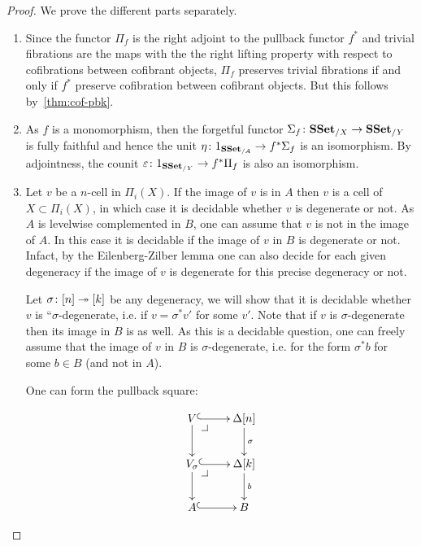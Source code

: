 \documentclass[reqno,10pt,a4paper,oneside,draft]{amsart}
\begin{document}
 
\begin{proof} We prove the different parts separately. 
\begin{enumerate}[$(i)$] 
\item 

Since the functor $\Pi_f$ is the right adjoint to the pullback functor $f^*$ and trivial fibrations are the maps with the the right lifting property with respect to cofibrations between cofibrant objects, $\Pi_f$ preserves trivial fibrations if and only if $f^*$ preserve cofibration between cofibrant objects. But this follows by~\cref{thm:cof-pbk}.

\item As $f$ is a monomorphism, then the forgetful functor $\Sigma_{f} \colon \mathbf{SSet}_{/X} \rightarrow \mathbf{SSet}_{/Y}$ is fully faithful and hence the unit $\eta \colon 1_{\mathbf{SSet}_{/A}} \rightarrow f^* \Sigma_{f}$ is an isomorphism. By adjointness, the counit $\varepsilon \colon 1_{\mathbf{SSet}_{/Y}} \rightarrow f^* \Pi_f$ is also an isomorphism.

\item Let $v$ be a $n$-cell in $\Pi_i(X)$.
If the image of $v$ is in $A$ then $v$ is a cell of $X \subset \Pi_i(X)$, in which case it is decidable whether $v$ is degenerate or not.
As $A$ is levelwise complemented in $B$, one can assume that $v$ is not in the image of $A$. In this case it is decidable if the image of $v$ in $B$ is degenerate or not.
Infact, by the Eilenberg-Zilber lemma one can also decide for each given degeneracy if the image of $v$ is degenerate for this precise degeneracy or not. 

Let $\sigma \colon [n] \twoheadrightarrow [k]$ be any degeneracy, we will show that it is decidable whether $v$ is ``$\sigma$-degenerate, i.e. if $v =\sigma^* v'$ for some $v'$. Note that if $v$ is $\sigma$-degenerate then its image in $B$ is as well. As this is a decidable question, one can freely assume that the image of $v$ in $B$ is $\sigma$-degenerate, i.e. for the form $\sigma^* b$ for some $b \in B$ (and not in $A$).

 One can form the pullback square:


\[
\xymatrix{
V \ar@{^{(}->}[r] \drpullback \ar[d] & \Delta[n] \ar@{->}[d]^{\sigma} \\
V_{\sigma} \ar@{^{(}->}[r] \drpullback \ar[d] & \Delta[k] \ar@{->}[d]^b \\
A \ar@{^{(}->}[r] &  B }
\]


\end{enumerate}
\end{proof}
\end{document}

